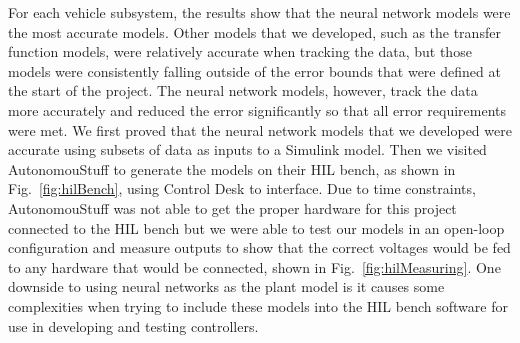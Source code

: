 \documentclass[conference]{IEEEtran}
\begin{document}
For each vehicle subsystem, the results show that the neural network models were the most accurate models. Other models that we developed, such as the transfer function models, were relatively accurate when tracking the data, but those models were consistently falling outside of the error bounds that were defined at the start of the project. The neural network models, however, track the data more accurately and reduced the error significantly so that all error requirements were met. We first proved that the neural network models that we developed were accurate using subsets of data as inputs to a Simulink model. Then we visited AutonomouStuff to generate the models on their HIL bench, as shown in Fig.~\ref{fig:hilBench}, using Control Desk to interface. Due to time constraints, AutonomouStuff was not able to get the proper hardware for this project connected to the HIL bench but we were able to test our models in an open-loop configuration and measure outputs to show that the correct voltages would be fed to any hardware that would be connected, shown in Fig.~\ref{fig:hilMeasuring}. One downside to using neural networks as the plant model is it causes some complexities when trying to include these models into the HIL bench software for use in developing and testing controllers.
\end{document}
